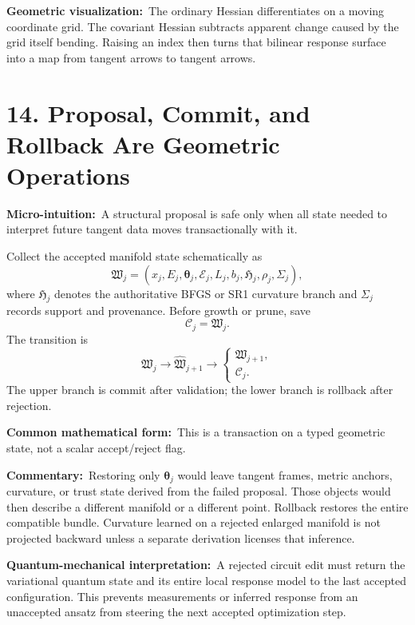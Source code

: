 \documentclass[10pt,twocolumn]{article}
\newcommand{\micro}[1]{\par\noindent\textbf{Micro-intuition:}\ #1\par}
\newcommand{\form}[1]{\par\noindent\textbf{Common mathematical form:}\ #1\par}
\newcommand{\commentary}[1]{\par\noindent\textbf{Commentary:}\ #1\par}
\newcommand{\phys}[1]{\par\noindent\textbf{Quantum-mechanical interpretation:}\ #1\par}
\newcommand{\geom}[1]{\par\noindent\textbf{Geometric visualization:}\ \textcolor{teal!70!black}{#1}\par}
\newcommand{\conceptbreak}{\par\medskip\noindent{\color{black!30}\rule{\columnwidth}{0.35pt}}\par\medskip}
\begin{document}
\geom{The ordinary Hessian differentiates on a moving coordinate grid. The
covariant Hessian subtracts apparent change caused by the grid itself bending.
Raising an index then turns that bilinear response surface into a map from
tangent arrows to tangent arrows.}

\conceptbreak

\section*{14. Proposal, Commit, and Rollback Are Geometric Operations}

\micro{A structural proposal is safe only when all state needed to interpret
future tangent data moves transactionally with it.}

Collect the accepted manifold state schematically as
\begin{equation}
\mathfrak W_j
=(x_j,E_j,\bm\theta_j,\mathcal E_j,L_j,b_j,
\mathfrak H_j,\rho_j,\Sigma_j),
\label{eq:transaction-state}
\end{equation}
where \(\mathfrak H_j\) denotes the authoritative BFGS or SR1 curvature branch
and \(\Sigma_j\) records support and provenance. Before growth or prune, save
\begin{equation}
\mathcal C_j=\mathfrak W_j.
\label{eq:checkpoint}
\end{equation}
The transition is
\begin{equation}
\mathfrak W_j
\longrightarrow
\widehat{\mathfrak W}_{j+1}
\longrightarrow
\begin{cases}
\mathfrak W_{j+1},\\
\mathcal C_j.
\end{cases}
\label{eq:transaction}
\end{equation}
The upper branch is commit after validation; the lower branch is rollback
after rejection.

\form{This is a transaction on a typed geometric state, not a scalar
accept/reject flag.}

\commentary{Restoring only \(\bm\theta_j\) would leave tangent frames, metric
anchors, curvature, or trust state derived from the failed proposal. Those
objects would then describe a different manifold or a different point. Rollback
restores the entire compatible bundle. Curvature learned on a rejected enlarged
manifold is not projected backward unless a separate derivation licenses that
inference.}

\phys{A rejected circuit edit must return the variational quantum state and its
entire local response model to the last accepted configuration. This prevents
measurements or inferred response from an unaccepted ansatz from steering the
next accepted optimization step.}
\end{document}
